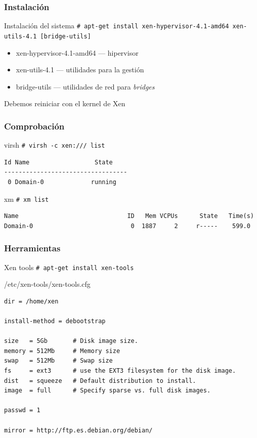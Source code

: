 \documentclass{beamer}
\begin{document}
\begin{frame}
  \frametitle{Instalación}
  \begin{block}{Instalación del sistema}
    \texttt{\# apt-get install xen-hypervisor-4.1-amd64 xen-utils-4.1 [bridge-utils]}
    \begin{itemize}
      \item xen-hypervisor-4.1-amd64 --- hipervisor
      \item xen-utils-4.1 --- utilidades para la gestión
      \item bridge-utils --- utilidades de red para \textit{bridges}
    \end{itemize}
    \bigskip
  \end{block}
  Debemos reiniciar con el kernel de Xen
\end{frame}

\begin{frame}[fragile]
  \frametitle{Comprobación}
  \begin{block}{virsh}
    \texttt{\# virsh -c xen:/// list} \\
    \small{\begin{verbatim}
Id Name                  State
----------------------------------
 0 Domain-0             running
    \end{verbatim}}
  \end{block}
  \bigskip
  \begin{block}{xm}
    \texttt{\# xm list} \\
    \tiny{\begin{verbatim}
Name                              ID   Mem VCPUs      State   Time(s)
Domain-0                           0  1887     2     r-----    599.0
    \end{verbatim}}
  \end{block}
\end{frame}

\begin{frame}[fragile]
  \frametitle{Herramientas}
  \begin{block}{Xen tools}
    \texttt{\# apt-get install xen-tools}
  \end{block}
  \begin{block}{/etc/xen-tools/xen-tools.cfg}
    \tiny{\begin{verbatim}
dir = /home/xen

install-method = debootstrap

size   = 5Gb       # Disk image size.
memory = 512Mb     # Memory size
swap   = 512Mb     # Swap size
fs     = ext3      # use the EXT3 filesystem for the disk image.
dist   = squeeze   # Default distribution to install.
image  = full      # Specify sparse vs. full disk images.

passwd = 1

mirror = http://ftp.es.debian.org/debian/
    \end{verbatim}}
  \end{block}
\end{frame}
\end{document}

